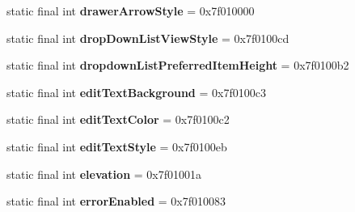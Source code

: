 \begin{DoxyCompactItemize}
\item 
\hypertarget{classandroid_1_1support_1_1design_1_1_r_1_1attr_a067fc22595374f6cf79df43697f707d0}{}static final int {\bfseries drawer\+Arrow\+Style} = 0x7f010000\label{classandroid_1_1support_1_1design_1_1_r_1_1attr_a067fc22595374f6cf79df43697f707d0}

\item 
\hypertarget{classandroid_1_1support_1_1design_1_1_r_1_1attr_aecae50e199b147d3412c64228e7ffbfa}{}static final int {\bfseries drop\+Down\+List\+View\+Style} = 0x7f0100cd\label{classandroid_1_1support_1_1design_1_1_r_1_1attr_aecae50e199b147d3412c64228e7ffbfa}

\item 
\hypertarget{classandroid_1_1support_1_1design_1_1_r_1_1attr_a9771b11e6d5d4f3ac5339bfa4afb5bdf}{}static final int {\bfseries dropdown\+List\+Preferred\+Item\+Height} = 0x7f0100b2\label{classandroid_1_1support_1_1design_1_1_r_1_1attr_a9771b11e6d5d4f3ac5339bfa4afb5bdf}

\item 
\hypertarget{classandroid_1_1support_1_1design_1_1_r_1_1attr_ae5151ecdcfbdc46e6e424c79b60548ee}{}static final int {\bfseries edit\+Text\+Background} = 0x7f0100c3\label{classandroid_1_1support_1_1design_1_1_r_1_1attr_ae5151ecdcfbdc46e6e424c79b60548ee}

\item 
\hypertarget{classandroid_1_1support_1_1design_1_1_r_1_1attr_ae5bffd7d1a0defcc8af0a2d675908267}{}static final int {\bfseries edit\+Text\+Color} = 0x7f0100c2\label{classandroid_1_1support_1_1design_1_1_r_1_1attr_ae5bffd7d1a0defcc8af0a2d675908267}

\item 
\hypertarget{classandroid_1_1support_1_1design_1_1_r_1_1attr_ac21901da73b034db7da8b6598b5954a5}{}static final int {\bfseries edit\+Text\+Style} = 0x7f0100eb\label{classandroid_1_1support_1_1design_1_1_r_1_1attr_ac21901da73b034db7da8b6598b5954a5}

\item 
\hypertarget{classandroid_1_1support_1_1design_1_1_r_1_1attr_a32597814963a4ec5dd120c66e7ac7f15}{}static final int {\bfseries elevation} = 0x7f01001a\label{classandroid_1_1support_1_1design_1_1_r_1_1attr_a32597814963a4ec5dd120c66e7ac7f15}

\item 
\hypertarget{classandroid_1_1support_1_1design_1_1_r_1_1attr_a33177626e9eac6ee0f334023420ed888}{}static final int {\bfseries error\+Enabled} = 0x7f010083\label{classandroid_1_1support_1_1design_1_1_r_1_1attr_a33177626e9eac6ee0f334023420ed888}


\end{DoxyCompactItemize}
